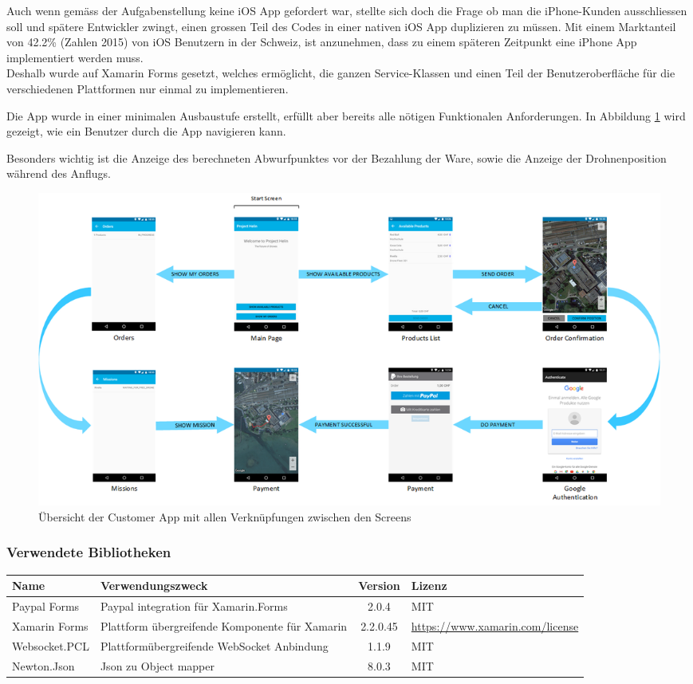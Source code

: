 Auch wenn gemäss der Aufgabenstellung keine iOS App gefordert war, stellte sich doch die Frage ob man die iPhone-Kunden ausschliessen soll und spätere Entwickler zwingt, einen grossen Teil des Codes in einer nativen iOS App duplizieren zu müssen. Mit einem Marktanteil von 42.2\% (Zahlen 2015) \cite{ios-user} von iOS Benutzern in der Schweiz, ist anzunehmen, dass zu einem späteren Zeitpunkt eine iPhone App implementiert werden muss.\\

Deshalb wurde auf Xamarin Forms gesetzt, welches ermöglicht, die ganzen Service-Klassen und einen Teil der Benutzeroberfläche für die verschiedenen Plattformen nur einmal zu implementieren.

Die App wurde in einer minimalen Ausbaustufe erstellt, erfüllt aber bereits alle nötigen Funktionalen Anforderungen. In Abbildung \ref{fig:customer-app-flow} wird gezeigt, wie ein Benutzer durch die App navigieren kann. 

Besonders wichtig ist die Anzeige des berechneten Abwurfpunktes vor der Bezahlung der Ware, sowie die Anzeige der Drohnenposition während des Anflugs.  

\begin{landscape}
	\begin{figure}[h]
		\centering
		\includegraphics[width=0.8\paperheight] {images/customer-app-pages.png}
		\caption{Übersicht der Customer App mit allen Verknüpfungen zwischen den Screens}
		\label{fig:customer-app-flow}
	\end{figure}
\end{landscape}

\subsubsection{Verwendete Bibliotheken}
\begin{tabularx}{\textwidth}{|X|X|c|X|}
	\hline
	\textbf{Name} & \textbf{Verwendungszweck} & \textbf{Version} & \textbf{Lizenz} \\
	\hline \hline
	Paypal Forms & Paypal integration für Xamarin.Forms & 2.0.4 & MIT \\
	\hline 
	Xamarin Forms & Plattform übergreifende Komponente für Xamarin & 2.2.0.45 & \url{https://www.xamarin.com/license} \\
	\hline 
	Websocket.PCL & Plattformübergreifende WebSocket Anbindung & 1.1.9 & MIT \\
	\hline 
	Newton.Json & Json zu Object mapper & 8.0.3 & MIT \\
	\hline 
\end{tabularx}

